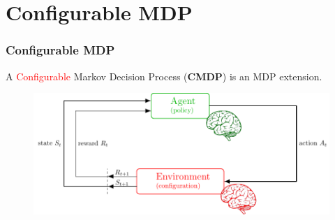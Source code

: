 \documentclass[english,aspectratio=1610]{beamer}
\theoremstyle{mystyle}
\newtheorem{defi}{Definition}
\theoremstyle{mystyle}
\theoremstyle{mystyle}
\begin{document}
\section{Configurable MDP}
\begin{frame}
\frametitle{Configurable MDP}
A \textcolor{red}{Configurable} Markov Decision Process \citep{cmdp} (\textbf{CMDP}) is an MDP extension.
\begin{figure}
\centering
\includegraphics[width=1\textwidth]{pictures/agentenvsup_v2}
\end{figure}
\end{frame}
\end{document}
